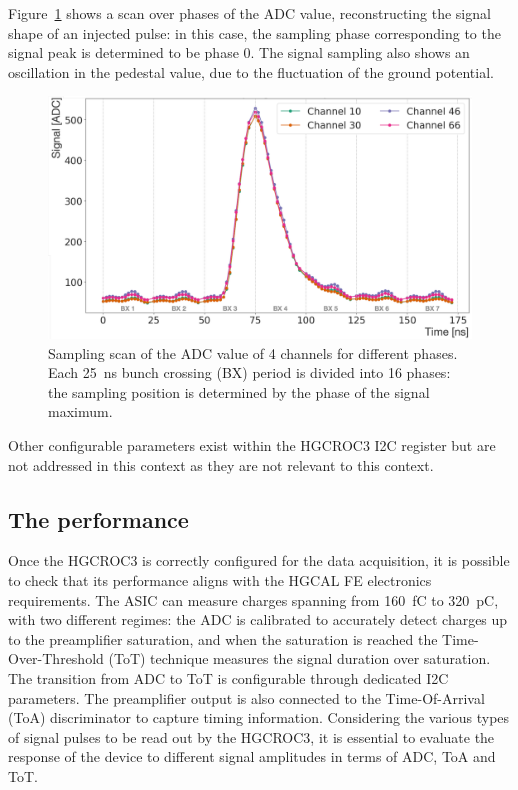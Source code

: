 Figure~\ref{fig:BestPhase} shows a scan over phases of the ADC value, reconstructing the signal shape of an injected pulse: in this case, the sampling phase corresponding to the signal peak is determined to be phase 0.
The signal sampling also shows an oscillation in the pedestal value, due to the fluctuation of the ground potential.

\begin{figure}
    \centering
    \includegraphics[width=0.65\linewidth]{Figures/HGCAL/BestPhase.pdf}
    \caption{Sampling scan of the ADC value of 4 channels for different phases. Each 25~ns bunch crossing (BX) period is divided into 16 phases: the sampling position is determined by the phase of the signal maximum.}
    \label{fig:BestPhase}
\end{figure}

\bigbreak

Other configurable parameters exist within the HGCROC3 I2C register but are not addressed in this context as they are not relevant to this context.

\subsection{The performance}
\label{subsec:The HGCROC3 performance}

Once the HGCROC3 is correctly configured for the data acquisition, it is possible to check that its performance aligns with the HGCAL FE electronics requirements.
The ASIC can measure charges spanning from 160~fC to 320~pC, with two different regimes: the ADC is calibrated to accurately detect charges up to the preamplifier saturation, and when the saturation is reached the Time-Over-Threshold (ToT) technique measures the signal duration over saturation. The transition from ADC to ToT is configurable through dedicated I2C parameters. The preamplifier output is also connected to the Time-Of-Arrival (ToA) discriminator to capture timing information. 
Considering the various types of signal pulses to be read out by the HGCROC3, it is essential to evaluate the response of the device to different signal amplitudes in terms of ADC, ToA and ToT.

